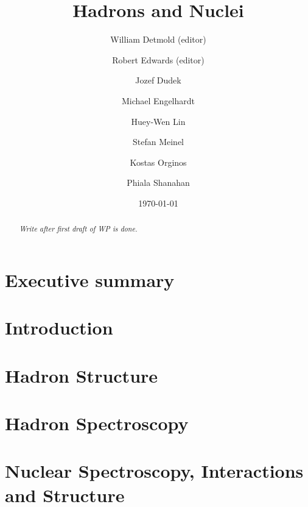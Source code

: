 \documentclass[aps,prd,nofootinbib,floatfix,superscriptaddress,preprint,tightenlines]{revtex4-1}
\begin{document}
\title{Hadrons and Nuclei}
%
\author{William Detmold (editor)}
%
\author{Robert Edwards (editor)}
%
\author{Jozef Dudek}
%
\author{Michael Engelhardt}
%
\author{Huey-Wen Lin}
%
\author{Stefan Meinel}
%
\author{Kostas Orginos}
%
\author{Phiala Shanahan}




\date{\today}
%
\begin{abstract}
\emph{Write after first draft of WP is done.}
    
\end{abstract}

\maketitle

\section*{Executive summary}


\newpage
\tableofcontents
\newpage 

\section{Introduction}
\label{sec:intro}


\section{Hadron Structure}
\label{sec:hadronstructure}


\section{Hadron Spectroscopy}
\label{sec:hadronspectroscopy}


\section{Nuclear Spectroscopy, Interactions and Structure}
\label{sec:nuclear}


\begin{figure}
    \vspace*{3cm}
\end{figure}



\end{document}
